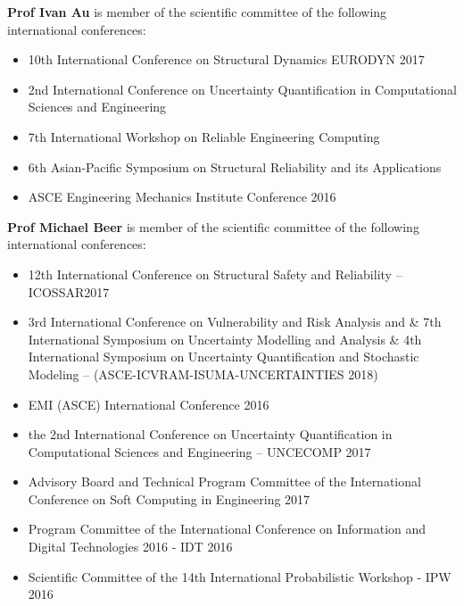 \documentclass[11pt]{article}%
\begin{document}
\begin{minipage}[t]{0.99\textwidth}
{\bf Prof Ivan Au} is member of the scientific committee of the following international conferences:
    \begin{itemize}
        \item 10th International Conference on Structural Dynamics EURODYN 2017
        \vspace{5pt}
        \item 2nd International Conference on Uncertainty Quantification in Computational Sciences and Engineering
        \vspace{5pt}
        \item 7th International Workshop on Reliable Engineering Computing
        \vspace{5pt}
        \item 6th Asian-Pacific Symposium on Structural Reliability and its Applications
        \vspace{5pt}
        \item ASCE Engineering Mechanics Institute Conference 2016
    \end{itemize}
\vspace{5pt}
{\bf Prof Michael Beer} is member of the scientific committee of the following international conferences:
    \begin{itemize}
        \item 12th International Conference on Structural Safety and Reliability –  ICOSSAR2017
        \vspace{5pt}
        \item 3rd International Conference on Vulnerability and Risk Analysis and \& 7th International Symposium on Uncertainty Modelling and Analysis \& 4th International Symposium on Uncertainty Quantification and Stochastic Modeling – (ASCE-ICVRAM-ISUMA-UNCERTAINTIES 2018)
        \vspace{5pt}
        \item EMI (ASCE) International Conference 2016
        \vspace{5pt}
        \item  the 2nd International Conference on Uncertainty Quantification in Computational Sciences and Engineering – UNCECOMP 2017
        \vspace{5pt}
        \item Advisory Board and Technical Program Committee of the International Conference on Soft Computing in Engineering 2017
        \vspace{5pt}
        \item Program Committee of the International Conference on Information and Digital Technologies 2016 - IDT 2016
        \vspace{5pt}
        \item Scientific Committee of the 14th International Probabilistic Workshop - IPW 2016 
    \end{itemize}


\end{minipage}
\end{document}
